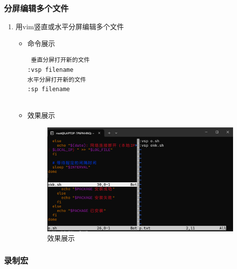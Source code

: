 \documentclass[UTF8]{ctexart}
\begin{document}
\subsubsection{分屏编辑多个文件}

\begin{enumerate}
  \item 用vim竖直或水平分屏编辑多个文件
  \begin{itemize}
  \item 命令展示
  \begin{verbatim}
 垂直分屏打开新的文件
:vsp filename
水平分屏打开新的文件
:sp filename
 
  \end{verbatim}

  \item 效果展示
  \begin{figure}[H]
    \centering
    \includegraphics[width=\textwidth]{22} %
    \caption{效果展示}
  
  \end{figure}
\end{itemize}
\end{enumerate}

\subsubsection{ 录制宏}
\end{document}
